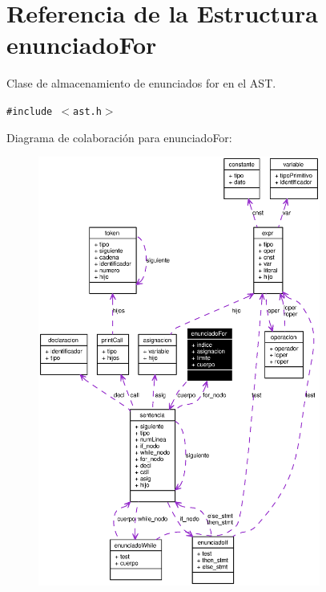 \section{Referencia de la Estructura enunciado\-For}
\label{structenunciadoFor}
Clase de almacenamiento de enunciados for en el AST.  


{\tt \#include $<$ast.h$>$}

Diagrama de colaboraci\'{o}n para enunciado\-For:\begin{figure}[H]
\begin{center}
\leavevmode
\includegraphics[width=263pt]{structenunciadoFor__coll__graph}
\end{center}
\end{figure}
